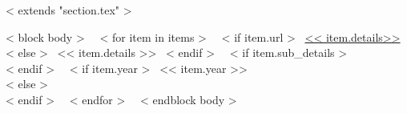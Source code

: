 ~< extends "section.tex" >~

~< block body >~
  ~< for item in items >~
    ~< if item.url >~
      \href{<< item.url >>}{<< item.details>>}
    ~< else >~
      << item.details >>
    ~< endif >~
    ~< if item.sub_details >~
      \,\, {\scriptsize
        \color{gray}{<< item.sub_details >>}
      } \\[2mm]
    ~< endif >~
    ~< if item.year >~
        \hfill << item.year >> \\
    ~< else >~
       \\[2mm]
    ~< endif >~
  ~< endfor >~
~< endblock body >~